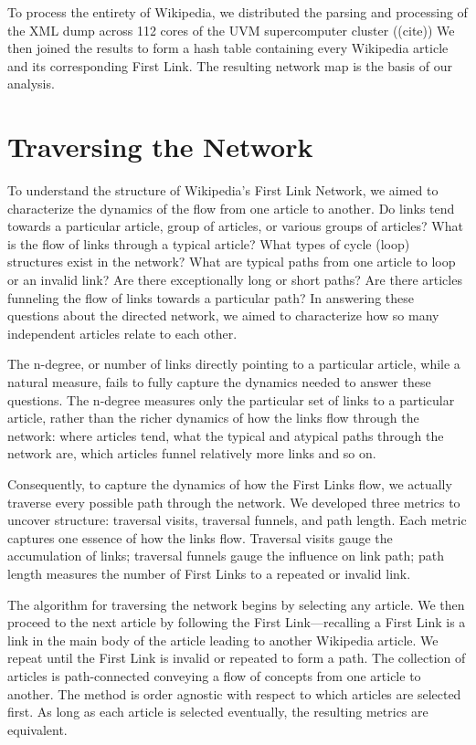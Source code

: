 \documentclass[twoside]{article}
\begin{document}
To process the entirety of Wikipedia, we distributed the parsing and processing of the XML dump
across 112 cores of the UVM supercomputer cluster
((cite))
We then joined the results to form a hash table containing every Wikipedia article and its corresponding
First Link. The resulting network map is the basis of our analysis.


\section{Traversing the Network}

To understand the structure of Wikipedia's First Link Network, we
aimed to characterize the dynamics of the flow from one article to another. 
Do links tend towards a particular article, group of articles, or various groups of articles? 
What is the flow of links through a typical article?
What types of cycle (loop) structures exist in the network?
What are typical paths from one article to loop or an invalid link? 
Are there exceptionally long or short paths? 
Are there articles funneling the flow of links towards a particular path?
In answering these questions about the directed network, we aimed to characterize 
how so many independent articles relate to each other.

The n-degree, or number of links directly pointing to a particular article,
while a natural measure, fails to fully capture the dynamics needed to answer these questions.
The n-degree measures only the particular set of links to a particular article, 
rather than the richer dynamics of how the links flow through the network: 
where articles tend, what the typical and atypical 
paths through the network are, which articles funnel relatively more links and so on. 

Consequently, to capture the dynamics of how the First Links flow, we actually traverse every possible path through the network. 
We developed three metrics to uncover structure: traversal visits, traversal funnels, and path length. Each metric captures one essence of how the links flow. Traversal visits gauge the accumulation of links; traversal funnels gauge the influence on link path; path length measures the number of First Links to a repeated or invalid link. 


The algorithm for traversing the network begins by selecting any article. We then proceed to the next article by following the First Link---recalling a First Link is a link in the main body of the article leading to another Wikipedia article. We repeat until the First Link is invalid or repeated to form a path. The collection of articles is path-connected conveying a flow of concepts from one article to another. 
The method is order agnostic with respect to which articles are selected first.
As long as each article is selected eventually, the resulting metrics are equivalent.
\end{document}
